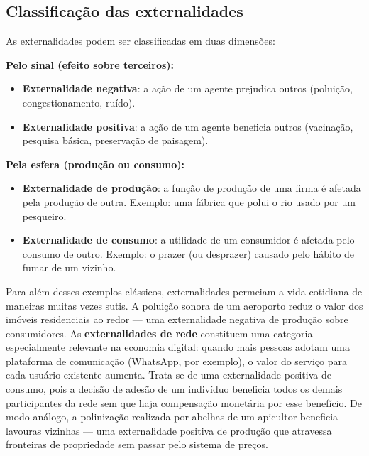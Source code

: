 \documentclass[11pt,twoside,openright]{book}
\providecommand{\tightlist}{\setlength{\itemsep}{0pt}\setlength{\parskip}{0pt}}
\begin{document}
\subsection{Classificação das
externalidades}\label{classificauxe7uxe3o-das-externalidades}

As externalidades podem ser classificadas em duas dimensões:

\textbf{Pelo sinal (efeito sobre terceiros):}

\begin{itemize}
\tightlist
\item
  \textbf{Externalidade negativa}: a ação de um agente prejudica outros
  (poluição, congestionamento, ruído).
\item
  \textbf{Externalidade positiva}: a ação de um agente beneficia outros
  (vacinação, pesquisa básica, preservação de paisagem).
\end{itemize}

\textbf{Pela esfera (produção ou consumo):}

\begin{itemize}
\tightlist
\item
  \textbf{Externalidade de produção}: a função de produção de uma firma
  é afetada pela produção de outra. Exemplo: uma fábrica que polui o rio
  usado por um pesqueiro.
\item
  \textbf{Externalidade de consumo}: a utilidade de um consumidor é
  afetada pelo consumo de outro. Exemplo: o prazer (ou desprazer)
  causado pelo hábito de fumar de um vizinho.
\end{itemize}

Para além desses exemplos clássicos, externalidades permeiam a vida
cotidiana de maneiras muitas vezes sutis. A poluição sonora de um
aeroporto reduz o valor dos imóveis residenciais ao redor --- uma
externalidade negativa de produção sobre consumidores. As
\textbf{externalidades de rede} constituem uma categoria especialmente
relevante na economia digital: quando mais pessoas adotam uma plataforma
de comunicação (WhatsApp, por exemplo), o valor do serviço para cada
usuário existente aumenta. Trata-se de uma externalidade positiva de
consumo, pois a decisão de adesão de um indivíduo beneficia todos os
demais participantes da rede sem que haja compensação monetária por esse
benefício. De modo análogo, a polinização realizada por abelhas de um
apicultor beneficia lavouras vizinhas --- uma externalidade positiva de
produção que atravessa fronteiras de propriedade sem passar pelo sistema
de preços.
\end{document}

